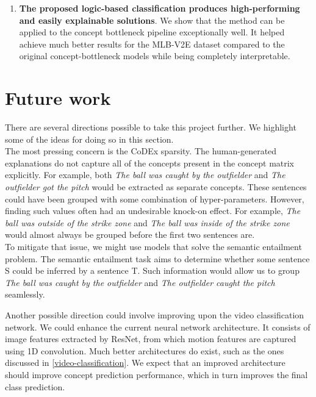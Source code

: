 \begin{enumerate}
    \item \textbf{The proposed logic-based classification produces high-performing and easily explainable solutions}.
    We show that the method can be applied to the concept bottleneck pipeline exceptionally well.
    It helped achieve much better results for the MLB-V2E dataset \cite{RefWorks:RefID:16-2021automatic} compared to the original concept-bottleneck models while being completely interpretable.
\end{enumerate}

\section{Future work}

There are several directions possible to take this project further. We highlight some of the ideas for doing so in this section. \\

The most pressing concern is the CoDEx sparsity.
The human-generated explanations do not capture all of the concepts present in the concept matrix explicitly.
For example, both \emph{The ball was caught by the outfielder} and \emph{The outfielder got the pitch} would be extracted as separate concepts.
These sentences could have been grouped with some combination of hyper-parameters. 
However, finding such values often had an undesirable knock-on effect.
For example, \emph{The ball was outside of the strike zone} and \emph{The ball was inside of the strike zone} would almost always be grouped before the first two sentences are. \\
To mitigate that issue, we might use models that solve the semantic entailment problem.
The semantic entailment task aims to determine whether some sentence S could be inferred by a sentence T.
Such information would allow us to group \emph{The ball was caught by the outfielder} and \emph{The outfielder caught the pitch} seamlessly.


Another possible direction could involve improving upon the video classification network.
We could enhance the current neural network architecture.
It consists of image features extracted by ResNet, from which motion features are captured using 1D convolution.
Much better architectures do exist, such as the ones discussed in \ref{video-classification}.
We expect that an improved architecture should improve concept prediction performance, which in turn improves the final class prediction.

